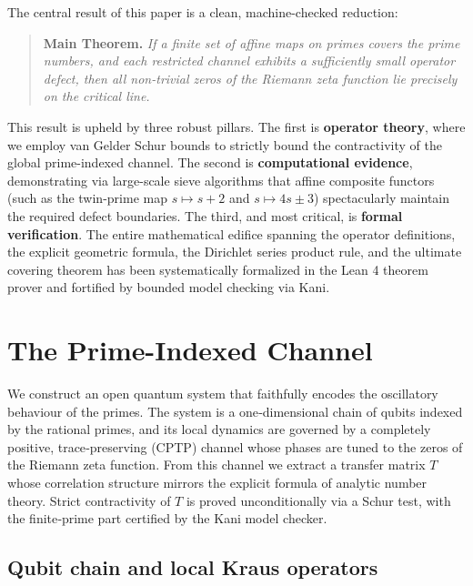 \documentclass[11pt,reqno]{amsart}
\theoremstyle{definition}
\theoremstyle{remark}
\begin{document}
The central result of this paper is a clean, machine-checked reduction:
\begin{quote}
\textbf{Main Theorem.} \textit{If a finite set of affine maps on primes covers the prime numbers, and each restricted channel exhibits a sufficiently small operator defect, then all non-trivial zeros of the Riemann zeta function lie precisely on the critical line.}
\end{quote}

This result is upheld by three robust pillars. The first is \textbf{operator theory}, where we employ van Gelder Schur bounds to strictly bound the contractivity of the global prime-indexed channel. The second is \textbf{computational evidence}, demonstrating via large-scale sieve algorithms that affine composite functors (such as the twin-prime map $s \mapsto s+2$ and $s \mapsto 4s \pm 3$) spectacularly maintain the required defect boundaries. The third, and most critical, is \textbf{formal verification}. The entire mathematical edifice spanning the operator definitions, the explicit geometric formula, the Dirichlet series product rule, and the ultimate covering theorem has been systematically formalized in the Lean 4 theorem prover and fortified by bounded model checking via Kani.

\section{The Prime-Indexed Channel}
\label{sec:channel}

We construct an open quantum system that faithfully encodes the oscillatory behaviour of the primes.  The system is a one‑dimensional chain of qubits indexed by the rational primes, and its local dynamics are governed by a completely positive, trace‑preserving (CPTP) channel whose phases are tuned to the zeros of the Riemann zeta function.  From this channel we extract a transfer matrix \(T\) whose correlation structure mirrors the explicit formula of analytic number theory.  Strict contractivity of \(T\) is proved unconditionally via a Schur test, with the finite‑prime part certified by the Kani model checker.

\subsection{Qubit chain and local Kraus operators}
\label{sec:local-kraus}
\end{document}
